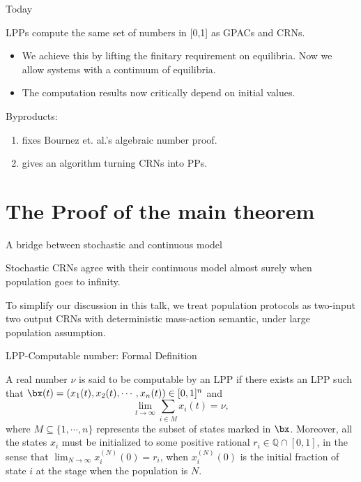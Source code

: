 \documentclass[aspectratio=169]{beamer}
\begin{document}
\begin{frame}{Today}
\begin{todaythm}
    LPPs compute the same set of numbers in [0,1] as GPACs
and CRNs.
\end{todaythm}
\pause
\begin{itemize}
    \item We achieve this by lifting the finitary requirement on equilibria. Now we allow systems with a continuum of equilibria.
    \item The computation results now critically depend  on initial values.
\end{itemize}\pause
Byproducts:
\begin{enumerate}
    \item fixes Bournez et. al.'s algebraic number proof.
    \item gives an algorithm turning CRNs into PPs.
\end{enumerate}
\end{frame}

\section{The Proof of the main theorem}
\begin{frame}[Clean]{A bridge between stochastic and continuous model}
    \begin{kurtz}
        Stochastic CRNs agree with their continuous model almost surely when population goes to infinity.
    \end{kurtz}

To simplify our discussion in this talk, we treat population protocols as two-input two output CRNs with deterministic mass-action semantic, under large population assumption.
\end{frame}
\begin{frame}{LPP-Computable number: Formal Definition}
\begin{definition}
    A real number $\nu$ is said to be computable by an LPP if there exists an LPP such that $\bx(t)=(x_1(t),x_2(t),\cdots,x_n(t))\in [0,1]^n$ and
    \[
        \lim_{t\to \infty}\sum_{i\in M}x_i(t)=\nu,
    \]where $M\subseteq\{1,\cdots, n\}$ represents the subset of states marked in $\bx$. Moreover, all the states $x_i$ must be initialized to some positive rational $r_i\in \mathbb{Q}\cap[0,1]$, in the sense that $\lim_{N\to \infty} x_i^{(N)}(0)=r_i$, when $x_i^{(N)}(0)$ is the initial fraction of state $i$ at the stage when the population is $N$.
\end{definition}
\end{frame}
\end{document}
